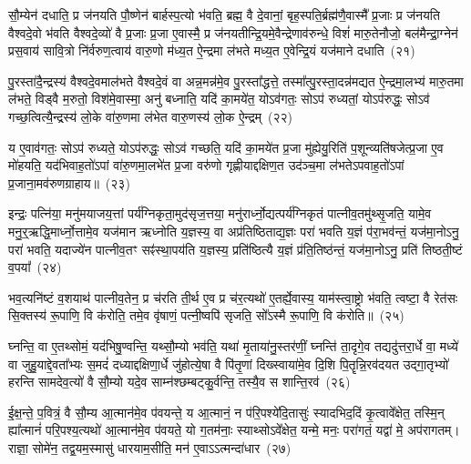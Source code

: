सौ॒म्येन॑ दधाति॒ प्र ज॑नयति पौ॒ष्णेन॑ बार्\mbox{}हस्प॒त्यो भ॑वति॒ ब्रह्म॒ वै दे॒वानां॒ बृह॒स्पति॒र्ब्रह्म॑णै॒वास्मै᳚ प्र॒जाः प्र ज॑नयति वैश्वदे॒वो भ॑वति वैश्वदे॒व्यो॑ वै प्र॒जाः प्र॒जा ए॒वास्मै॒ प्र ज॑नयतीन्द्रि॒यमे॒वैन्द्रेणाव॑रुन्धे॒ विशं॑ मारु॒तेनौजो॒ बल॑मैन्द्रा॒ग्नेन॑ प्रस॒वाय॑ सावि॒त्रो नि॑र्वरुण॒त्वाय॑ वारु॒णो म॑ध्य॒त ऐ॒न्द्रमा ल॑भते मध्य॒त ए॒वेन्द्रि॒यं यज॑माने दधाति~(२१)\ip

पु॒रस्ता॑दै॒न्द्रस्य॑ वैश्वदे॒वमाल॑भते वैश्वदे॒वं वा अन्न॒मन्न॑मे॒व पु॒रस्ता᳚द्धत्ते॒ तस्मा᳚त्पु॒रस्ता॒दन्न॑मद्यत ऐ॒न्द्रमा॒लभ्य॑ मारु॒तमा ल॑भते॒ विड्वै म॒रुतो॒ विश॑मे॒वास्मा॒ अनु॑ बध्नाति॒ यदि॑ का॒मये॑त॒ यो\-ऽव॑गतः॒ सो\-ऽप॑ रुध्यतां॒ यो\-ऽप॑रुद्धः॒ सो\-ऽव॑ गच्छ॒त्वित्यै॒न्द्रस्य॑ लो॒के वा॑रु॒णमा ल॑भेत वारु॒णस्य॑ लो॒क ऐ॒न्द्रम्~(२२)\ip

य ए॒वाव॑गतः॒ सो\-ऽप॑ रुध्यते॒ यो\-ऽप॑रुद्धः॒ सो\-ऽव॑ गच्छति॒ यदि॑ का॒मये॑त प्र॒जा मु॑ह्येयु॒रिति॑ प॒शून्व्यति॑षजेत्प्र॒जा ए॒व मो॑हयति॒ यद॑भिवाह॒तो॑\-ऽपां वा॑रु॒णमा॒लभे॑त प्र॒जा वरु॑णो गृह्णीयाद्दक्षिण॒त उद॑ञ्च॒मा ल॑भते\-ऽपवाह॒तो॑\-ऽ\-पां प्र॒जाना॒मव॑रुणग्राहाय॥~(२३)\ip

{\anuvakamend[{रेतो॒ यज॑माने दधाति लो॒क ऐ॒न्द्रꣳ स॒प्तत्रिꣳ॑शच्च}]}

इन्द्रः॒ पत्नि॑या॒ मनु॑मयाजय॒त्तां पर्य॑ग्निकृता॒मुद॑सृज॒त्तया॒ मनु॑रार्ध्नो॒द्यत्पर्य॑ग्निकृतं पात्नीव॒तमु॑थ्सृ॒जति॒ यामे॒व मनु॒र्॒\mbox{}ऋद्धि॒\-मार्ध्नो॒त्तामे॒व यज॑मान ऋध्नोति य॒ज्ञस्य॒ वा अप्र॑तिष्ठिताद्य॒ज्ञः परा॑ भवति य॒ज्ञं प॑रा॒भव॑न्तं॒ यज॑मा॒नो\-ऽनु॒ परा॑ भवति॒ यदाज्ये॑न पात्नीव॒तꣳ सꣴ॑स्था॒पय॑ति य॒ज्ञस्य॒ प्रति॑ष्ठित्यै य॒ज्ञं प्र॑ति॒तिष्ठ॑न्तं॒ यज॑मा॒नो\-ऽनु॒ प्रति॑ तिष्ठती॒ष्टं व॒पया᳚~(२४)\ip

भव॒त्यनि॑ष्टं व॒शयाथ॑ पात्नीव॒तेन॒ प्र च॑रति ती॒र्थ ए॒व प्र च॑र॒त्यथो॑ ए॒तर्\mbox{}ह्ये॒वास्य॒ याम॑स्त्वा॒ष्ट्रो भ॑वति॒ त्वष्टा॒ वै रेत॑सः सि॒क्तस्य॑ रू॒पाणि॒ वि क॑रोति॒ तमे॒व वृ॑षाणं॒ पत्नी॒ष्वपि॑ सृजति॒ सो᳚\-ऽस्मै रू॒पाणि॒ वि क॑रोति॥~(२५)\ip

{\anuvakamend[{व॒पया॒ षट्त्रिꣳ॑शच्च}]}

घ्नन्ति॒ वा ए॒तथ्सोमं॒ यद॑भिषु॒ण्वन्ति॒ यथ्सौ॒म्यो भव॑ति॒ यथा॑ मृ॒ताया॑नु॒स्तर॑णीं॒ घ्नन्ति॑ ता॒दृगे॒व तद्यदु॑त्तरा॒र्धे वा॒ मध्ये॑ वा जुहु॒याद्दे॒वता᳚भ्यः स॒मदं॑ दध्याद्दक्षिणा॒र्धे जु॑होत्ये॒षा वै पि॑तृ॒णां दिख्स्वाया॑मे॒व दि॒शि पि॒तॄन्नि॒रव॑दयत उद्गा॒तृभ्यो॑ हरन्ति सामदेव॒त्यो॑ वै सौ॒म्यो यदे॒व साम्न॑श्छम्बट्कु॒र्वन्ति॒ तस्यै॒व स शान्ति॒रव॑~(२६)\ip

ई॒क्ष॒न्ते॒ प॒वित्रं॒ वै सौ॒म्य आ॒त्मान॑मे॒व प॑वयन्ते॒ य आ॒त्मानं॒ न प॑रि॒पश्ये॑दि॒तासुः॑ स्यादभिद॒दिं कृ॒त्वावे᳚क्षेत॒ तस्मि॒न् ह्या᳚त्मानं॑ परि॒पश्य॒त्यथो॑ आ॒त्मान॑मे॒व प॑वयते॒ यो ग॒तम॑नाः॒ स्याथ्सो\-ऽवे᳚क्षेत॒ यन्मे॒ मनः॒ परा॑गतं॒ यद्वा॑ मे॒ अप॑रागतम्। राज्ञा॒ सोमे॑न॒ तद्व॒यम॒स्मासु॑ धारयाम॒सीति॒ मन॑ ए॒वा\-ऽऽ\-त्मन्दा॑धार~(२७)\ip

